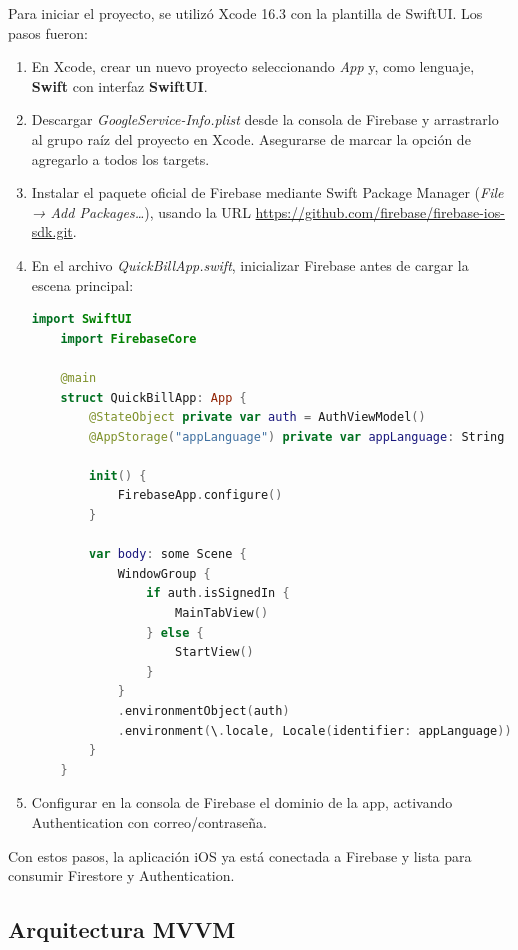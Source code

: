 \begin{large}

Para iniciar el proyecto, se utilizó Xcode 16.3 con la plantilla de SwiftUI. Los pasos fueron:

\begin{enumerate}
  \item En Xcode, crear un nuevo proyecto seleccionando \emph{App} y, como lenguaje, \textbf{Swift} con interfaz \textbf{SwiftUI}.
  \item Descargar \textit{GoogleService-Info.plist} desde la consola de Firebase y arrastrarlo al grupo raíz del proyecto en Xcode. Asegurarse de marcar la opción de agregarlo a todos los targets.
  \item Instalar el paquete oficial de Firebase mediante Swift Package Manager (\emph{File → Add Packages…}), usando la URL \url{https://github.com/firebase/firebase-ios-sdk.git}.
  \item En el archivo \textit{QuickBillApp.swift}, inicializar Firebase antes de cargar la escena principal:
    \begin{lstlisting}[language={swift}, caption={Inicialización de Firebase en QuickBillApp.swift}]
    import SwiftUI
    import FirebaseCore
    
    @main
    struct QuickBillApp: App {
        @StateObject private var auth = AuthViewModel()
        @AppStorage("appLanguage") private var appLanguage: String = AppLanguage.english.rawValue
        
        init() {
            FirebaseApp.configure()
        }
        
        var body: some Scene {
            WindowGroup {
                if auth.isSignedIn {
                    MainTabView()
                } else {
                    StartView()
                }
            }
            .environmentObject(auth)
            .environment(\.locale, Locale(identifier: appLanguage))
        }
    }
    \end{lstlisting}
  \item Configurar en la consola de Firebase el dominio de la app, activando Authentication con correo/contraseña.
\end{enumerate}

Con estos pasos, la aplicación iOS ya está conectada a Firebase y lista para consumir Firestore y Authentication.

\end{large}

\subsection{Arquitectura MVVM}

